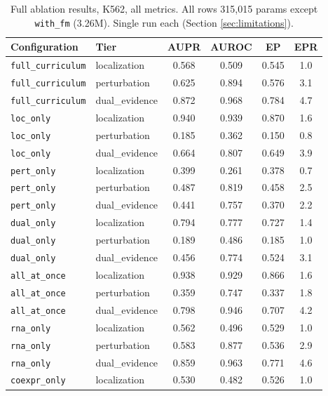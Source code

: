 \documentclass{article}
\theoremstyle{plain}
\theoremstyle{definition}
\begin{document}
\begin{table}[h]
\caption{Full ablation results, K562, all metrics. All rows 315{,}015 params except \texttt{with\_fm} (3.26M). Single
run each (Section \ref{sec:limitations}).}
\label{tab:full-ablation}
\begin{center}
\begin{small}
\begin{tabular}{llcccc}
\toprule
Configuration & Tier & AUPR & AUROC & EP & EPR \\
\midrule
\texttt{full\_curriculum} & localization & 0.568 & 0.509 & 0.545 & 1.0 \\
\texttt{full\_curriculum} & perturbation & 0.625 & 0.894 & 0.576 & 3.1 \\
\texttt{full\_curriculum} & dual\_evidence & 0.872 & 0.968 & 0.784 & 4.7 \\
\texttt{loc\_only} & localization & 0.940 & 0.939 & 0.870 & 1.6 \\
\texttt{loc\_only} & perturbation & 0.185 & 0.362 & 0.150 & 0.8 \\
\texttt{loc\_only} & dual\_evidence & 0.664 & 0.807 & 0.649 & 3.9 \\
\texttt{pert\_only} & localization & 0.399 & 0.261 & 0.378 & 0.7 \\
\texttt{pert\_only} & perturbation & 0.487 & 0.819 & 0.458 & 2.5 \\
\texttt{pert\_only} & dual\_evidence & 0.441 & 0.757 & 0.370 & 2.2 \\
\texttt{dual\_only} & localization & 0.794 & 0.777 & 0.727 & 1.4 \\
\texttt{dual\_only} & perturbation & 0.189 & 0.486 & 0.185 & 1.0 \\
\texttt{dual\_only} & dual\_evidence & 0.456 & 0.774 & 0.524 & 3.1 \\
\texttt{all\_at\_once} & localization & 0.938 & 0.929 & 0.866 & 1.6 \\
\texttt{all\_at\_once} & perturbation & 0.359 & 0.747 & 0.337 & 1.8 \\
\texttt{all\_at\_once} & dual\_evidence & 0.798 & 0.946 & 0.707 & 4.2 \\
\texttt{rna\_only} & localization & 0.562 & 0.496 & 0.529 & 1.0 \\
\texttt{rna\_only} & perturbation & 0.583 & 0.877 & 0.536 & 2.9 \\
\texttt{rna\_only} & dual\_evidence & 0.859 & 0.963 & 0.771 & 4.6 \\
\texttt{coexpr\_only} & localization & 0.530 & 0.482 & 0.526 & 1.0 \\

\end{tabular}
\end{small}
\end{center}
\end{table}
\end{document}
